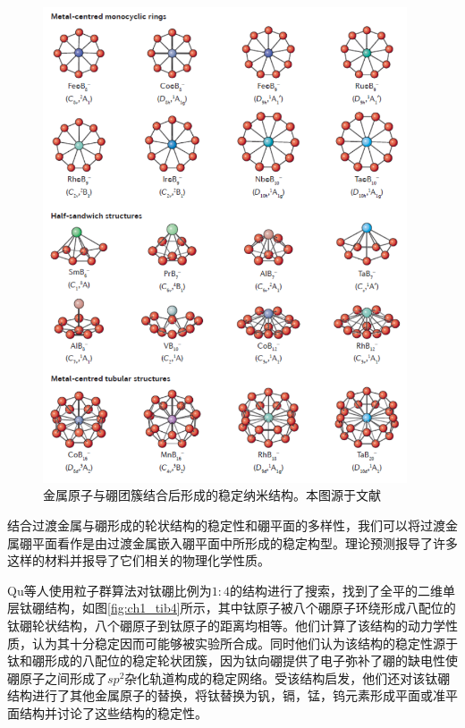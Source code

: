 \begin{figure}[bt]
  \includegraphics[width=0.96\textwidth]{figs/ch1_boron_metal_cluster.png}
  \centering
  \caption{金属原子与硼团簇结合后形成的稳定纳米结构。本图源于文献\cite{li2017planar}}
  \label{fig:ch1_boron_metal_cluster}
\end{figure}

结合过渡金属与硼形成的轮状结构的稳定性和硼平面的多样性，我们可以将过渡金属硼平面看作是由过渡金属嵌入硼平面中所形成的稳定构型。理论预测报导了许多这样的材料并报导了它们相关的物理化学性质。

Qu等人\cite{qu2017two}使用粒子群算法对钛硼比例为$1:4$的结构进行了搜索，找到了全平的二维单层钛硼结构，如图\ref{fig:ch1_tib4}所示，其中钛原子被八个硼原子环绕形成八配位的钛硼轮状结构，八个硼原子到钛原子的距离均相等。他们计算了该结构的动力学性质，认为其十分稳定因而可能够被实验所合成。同时他们认为该结构的稳定性源于钛和硼形成的八配位的稳定轮状团簇，因为钛向硼提供了电子弥补了硼的缺电性使硼原子之间形成了$sp^2$杂化轨道构成的稳定网络。受该结构启发，他们还对该钛硼结构进行了其他金属原子的替换，将钛替换为钒，镉，锰，钨元素形成平面或准平面结构并讨论了这些结构的稳定性。

